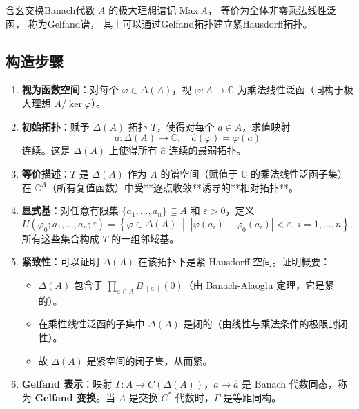 \documentclass[10pt, openany]{book}
\begin{document}
含幺交换Banach代数 $A$ 的极大理想谱记 
$\text{Max} \ A$，
等价为全体非零乘法线性泛函，
称为Gelfand谱，
其上可以通过Gelfand拓扑建立紧Hausdorff拓扑。


\subsection{构造步骤}

\begin{enumerate}
    \item \textbf{视为函数空间}：对每个 $\varphi \in \Delta(A)$，视 $\varphi: A \to \mathbb{C}$ 为乘法线性泛函（同构于极大理想 $A / \ker \varphi$）。
    
    \item \textbf{初始拓扑}：赋予 $\Delta(A)$ 拓扑 $T$，使得对每个 $a \in A$，求值映射
    \[
    \hat{a}: \Delta(A) \to \mathbb{C}, \quad \hat{a}(\varphi) = \varphi(a)
    \]
    连续。这是 $\Delta(A)$ 上使得所有 $\hat{a}$ 连续的最弱拓扑。
    
    \item \textbf{等价描述}：$T$ 是 $\Delta(A)$ 作为 $A$ 的谱空间（赋值于 $\mathbb{C}$ 的乘法线性泛函子集）在 $\mathbb{C}^A$（所有复值函数）中受**逐点收敛**诱导的**相对拓扑**。
    
    \item \textbf{显式基}：对任意有限集 $\{a_1,\dots,a_n\} \subseteq A$ 和 $\varepsilon > 0$，定义
    \[
    U(\varphi_0; a_1,\dots,a_n; \varepsilon) = \left\{ \varphi \in \Delta(A) \;\middle|\; |\varphi(a_i) - \varphi_0(a_i)| < \varepsilon,\ i=1,\dots,n \right\}.
    \]
    所有这些集合构成 $T$ 的一组邻域基。
    
    \item \textbf{紧致性}：可以证明 $\Delta(A)$ 在该拓扑下是紧 Hausdorff 空间。证明概要：
    \begin{itemize}
        \item $\Delta(A)$ 包含于 $\prod_{a\in A} \overline{B}_{\|a\|}(0)$（由 Banach-Alaoglu 定理，它是紧的）。
        \item 在乘性线性泛函的子集中 $\Delta(A)$ 是闭的（由线性与乘法条件的极限封闭性）。
        \item 故 $\Delta(A)$ 是紧空间的闭子集，从而紧。
    \end{itemize}
    
    \item \textbf{Gelfand 表示}：映射 $\Gamma: A \to C(\Delta(A))$，$a \mapsto \hat{a}$ 是 Banach 代数同态，称为 \textbf{Gelfand 变换}。当 $A$ 是交换 $C^*$-代数时，$\Gamma$ 是等距同构。
\end{enumerate}
\end{document}

